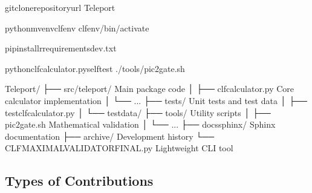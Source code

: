 \documentclass[letterpaper,10pt,english]{sphinxmanual}
\begin{document}
\sphinxAtStartPar
{}

\begin{sphinxVerbatim}[commandchars=\\\{\}]
gitclone\PYGZlt{}repository\PYGZhy{}url\PYGZgt{}
Teleport

python\PYGZhy{}mvenvclf\PYGZus{}env
clf\PYGZus{}env/bin/activate

pipinstall\PYGZhy{}rrequirements\PYGZhy{}dev.txt

pythonclf\PYGZus{}calculator.py\PYGZhy{}\PYGZhy{}self\PYGZhy{}test
./tools/pic2\PYGZus{}gate.sh
\end{sphinxVerbatim}

\sphinxAtStartPar
{}

\begin{sphinxVerbatim}[commandchars=\\\{\}]
Teleport/
├── src/teleport/           \PYGZsh{} Main package code
│   ├── clf\PYGZus{}calculator.py   \PYGZsh{} Core calculator implementation
│   └── ...
├── tests/                  \PYGZsh{} Unit tests and test data
│   ├── test\PYGZus{}clf\PYGZus{}calculator.py
│   └── test\PYGZus{}data/
├── tools/                  \PYGZsh{} Utility scripts
│   ├── pic2\PYGZus{}gate.sh       \PYGZsh{} Mathematical validation
│   └── ...
├── docs\PYGZus{}sphinx/           \PYGZsh{} Sphinx documentation
├── archive/               \PYGZsh{} Development history
└── CLF\PYGZus{}MAXIMAL\PYGZus{}VALIDATOR\PYGZus{}FINAL.py  \PYGZsh{} Lightweight CLI tool
\end{sphinxVerbatim}


\subsection{Types of Contributions}
\label{\detokenize{contributing:types-of-contributions}}
\sphinxAtStartPar
{}
\end{document}
